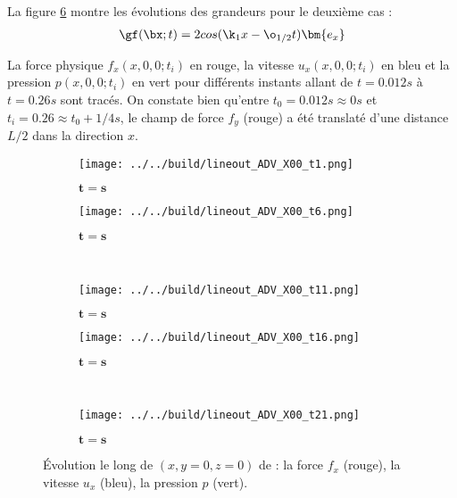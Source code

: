 La figure \ref{fig : X00} montre les évolutions des grandeurs pour le deuxième cas :
\begin{align}
\gf(\bx;t) = 2cos(\k_1 x - \o_{1/2}t) \bm{e_x}
\end{align} 

La force physique $f_x(x,0,0;t_i)$ en rouge, la vitesse $u_x(x,0,0;t_i)$ en bleu et la pression $p(x,0,0;t_i)$ en vert pour différents instants allant de $t=0.012s$ à $t=0.26s$ sont tracés. On constate bien qu'entre $t_0=0.012s \approx 0s$ et $t_i = 0.26 \approx t_0 + 1/4 s$, le champ de force $f_y$ (rouge) a été translaté d'une distance $L/2$ dans la direction $x$. 

\begin{figure}
\begin{center}
	\begin{subfigure}[t]{0.4\textwidth}                                                                                                                                   
		\texttt{[image: ../../build/lineout\_ADV\_X00\_t1.png]}
		\caption{ $\bm{t=s}$}
		\label{fig : X00_t1}
	\end{subfigure}\hfill
	\begin{subfigure}[t]{0.4\textwidth}
		\texttt{[image: ../../build/lineout\_ADV\_X00\_t6.png]}
		\caption{ $\bm{t=s}$}
		\label{fig : X00_t6}
	\end{subfigure}
\\
	\begin{subfigure}[t]{0.4\textwidth}
		\texttt{[image: ../../build/lineout\_ADV\_X00\_t11.png]}
		\caption{ $\bm{t=s}$}
		\label{fig : X00_t11}
	\end{subfigure}\hfill
	\begin{subfigure}[t]{0.4\textwidth}
		\texttt{[image: ../../build/lineout\_ADV\_X00\_t16.png]}
		\caption{ $\bm{t=s}$}
		\label{fig : X00_t16}
	\end{subfigure}
\\
	\begin{subfigure}[t]{0.4\textwidth}
		\texttt{[image: ../../build/lineout\_ADV\_X00\_t21.png]}
		\caption{ $\bm{t=s}$}
		\label{fig : X00_t21}
	\end{subfigure}	
\end{center}
\caption{Évolution le long de $(x,y=0,z=0)$ de : la force $f_x$ (rouge), la vitesse $u_x$ (bleu), la pression $p$ (vert).}
\label{fig : X00}
\end{figure}

